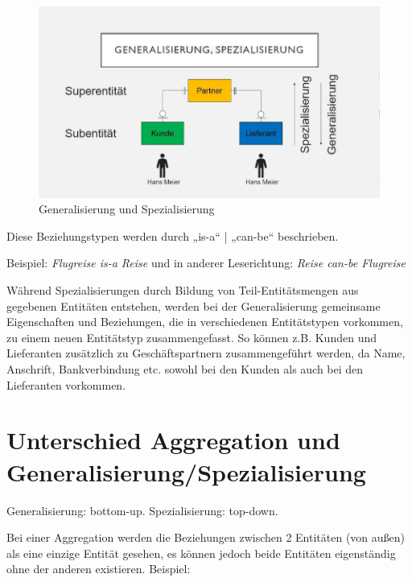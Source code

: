 \begin{figure}[h]
    \centering
    \includegraphics[width=.8\textwidth]{Content/images/modellierung/general.png}
    \caption{Generalisierung und Spezialisierung}
    \label{fig:modellierung:general}
\end{figure}

Diese Beziehungstypen werden durch „is-a“ | „can-be“ beschrieben.

Beispiel:
\textit{Flugreise is-a Reise} \newline
 	und in anderer Leserichtung: \newline
\textit{Reise can-be Flugreise}

Während Spezialisierungen durch Bildung von Teil-Entitätsmengen aus gegebenen Entitäten entstehen, werden bei der Generalisierung gemeinsame Eigenschaften und Beziehungen, die in verschiedenen Entitätstypen vorkommen, zu einem neuen Entitätstyp zusammengefasst. So können z.B. Kunden und Lieferanten zusätzlich zu Geschäftspartnern zusammengeführt werden, da Name, Anschrift, Bankverbindung etc. sowohl bei den Kunden als auch bei den Lieferanten vorkommen.

\section{Unterschied Aggregation und Generalisierung/Spezialisierung}

Generalisierung: bottom-up. \newline
Spezialisierung: top-down.

Bei einer Aggregation werden die Beziehungen zwischen 2 Entitäten (von außen) als eine einzige Entität gesehen, es können jedoch beide Entitäten eigenständig ohne der anderen existieren. 
Beispiel: 

